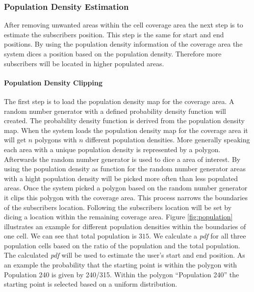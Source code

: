 \documentclass[master,english]{hgbthesis}
\begin{document}
\subsubsection{Population Density Estimation}
After removing unwanted areas within the cell coverage area the next step is to estimate the subscribers position. This step is the same for start and end positions. By using the population density information of the coverage area the system dices a position based on the population density. Therefore more subscribers will be located in higher populated areas.
\paragraph{Population Density Clipping}
The first step is to load the population density map for the coverage area. A random number generator with a defined probability density function will created. The probability density function is derived from the population density map. When the system loads the population density map for the coverage area it will get $n$ polygons with $n$ different population densities. More generally speaking each area with a unique population density is represented by a polygon. Afterwards the random number generator is used to dice a area of interest. By using the population density as function for the random number generator areas with a hight population density will be picked more often than less populated areas. Once the system picked a polygon based on the random number generator it clips this polygon with the coverage area. This process narrows the boundaries of the subscribers location. Following the subscribers location will be set by dicing a location within the remaining coverage area. Figure \ref{fig:population} illustrates an example for different population densities within the boundaries of one cell. We can see that total population is $315$. We calculate a \emph{pdf} for all three population cells based on the ratio of the population and the total population. The calculated \emph{pdf} will be used to estimate the user's start and end position. As an example the probability that the starting point is within the polygon with Population 240 is given by 240/315. Within the polygon ``Population 240'' the starting point is selected based on a uniform distribution.
\end{document}

